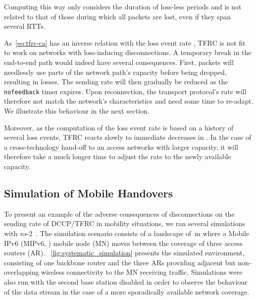 \documentclass[twocolumn]{nictatechreport}
\newcommand{\ns}{\textit{ns}}
\begin{document}
Computing  this way only considers the duration of loss-less periods and
is not related to that of those during which all packets are lost,
even if they span several RTTs.

As~\eqref{eq:tfrc-ca} has an inverse relation with the loss event rate , TFRC
is not fit to work on networks with loss-inducing disconnections.  A temporary
break in the end-to-end path would indeed have several consequences.  First,
packets will needlessly use parts of the network path's capacity before being
dropped, resulting in losses. The sending rate will then gradually be reduced as
the \verb#nofeedback# timer expires. Upon reconnection, the transport protocol's
rate will therefore not match the network's characteristics and need some time
to re-adapt. We illustrate this behaviour in the next section.

Moreover, as the computation of the loss event rate is based on a history of
several loss events, TFRC reacts slowly to immediate decreases in . In the
case of a cross-technology hand-off to an access networks with larger capacity,
it will therefore take a much longer time to adjust the rate to the newly
available capacity.

\subsection{Simulation of Mobile Handovers}
\label{sec:freezetfrc-mobile-handovers}

To present an example of the adverse consequences of disconnections on the
sending rate of DCCP/TFRC in mobility situations, we ran several simulations
with \ns-2~\cite{2009vint_ns_manual}.  The simulation scenario consists of a
landscape of \,m where a Mobile IPv6 (MIPv6, \cite{rfc3775})
mobile node (MN) moves between the coverage of three access routers (AR).
\figurename~\ref{fig:systematic_simulation} presents the simulated environment,
consisting of one backbone router and the three ARs providing adjacent but
non-overlapping wireless connectivity to the MN receiving traffic.  Simulations
were also run with the second base station disabled in order to observe the
behaviour of the data stream in the case of a more sporadically available
network coverage. 
\end{document}
